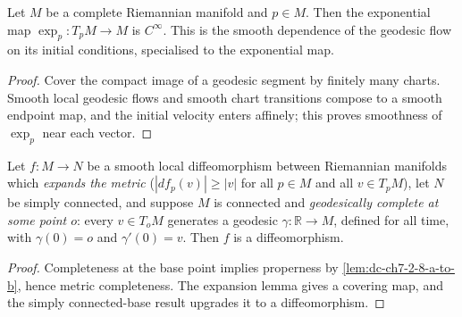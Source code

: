 \begin{lemma}

  \label{lem:dc-ch7-3-expmap-smooth}
  \leanok
Let $M$ be a complete Riemannian manifold and $p\in M$. Then the exponential map
  $\exp_p:T_pM\to M$ is $C^\infty$. This is the smooth dependence of the geodesic flow on its
  initial conditions, specialised to the exponential map.
\end{lemma}
\begin{proof}

  \leanok
\sketch Cover the compact image of a geodesic segment by finitely many charts. Smooth local geodesic flows and smooth chart transitions compose to a smooth endpoint map, and the initial velocity enters affinely; this proves smoothness of $\exp_p$ near each vector.
\end{proof}

\begin{lemma}

  \label{lem:dc-ch7-3-1-assembly}
  \leanok
Let $f:M\to N$ be a smooth local diffeomorphism between Riemannian manifolds which
  \emph{expands the metric} ($|df_p(v)|\ge|v|$ for all $p\in M$ and all $v\in T_pM$), let
  $N$ be simply connected, and suppose $M$ is connected and \emph{geodesically complete at
  some point $o$}: every $v\in T_oM$ generates a geodesic $\gamma:\mathbb R\to M$, defined
  for all time, with $\gamma(0)=o$ and $\gamma'(0)=v$. Then $f$ is a diffeomorphism.
\end{lemma}
\begin{proof}

  \leanok
\sketch Completeness at the base point implies properness by \cref{lem:dc-ch7-2-8-a-to-b}, hence metric completeness. The expansion lemma gives a covering map, and the simply connected-base result upgrades it to a diffeomorphism.
\end{proof}

